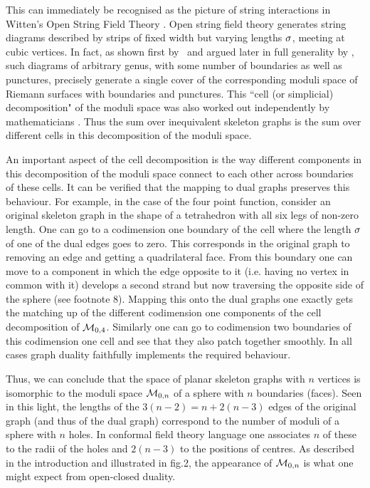 This can immediately be recognised as the picture of string
interactions in Witten's Open String Field Theory \witcube . Open
string field theory generates string diagrams described by strips
of fixed width but varying lengths ${\sigma}$, meeting at cubic vertices. In
fact, as shown first by \gmw\ and argued later in full generality
by \zwie , such diagrams of arbitrary genus, with some number of
boundaries as well as punctures, precisely generate a single cover
of the corresponding moduli space of Riemann surfaces with
boundaries and punctures. This ``cell (or simplicial) decomposition" 
of the moduli
space was also worked out independently 
by mathematicians \penn . 
Thus the sum over inequivalent 
skeleton graphs is the sum over different cells in this decomposition 
of the moduli space.


An important aspect of the cell decomposition is the way different
components in this decomposition of the moduli space connect to
each other across boundaries of these cells. It can be
verified that the mapping to dual graphs preserves this behaviour.
For example, in the case of the four point function, consider an
original skeleton graph in the shape of a tetrahedron with all six
legs of non-zero length. One can go to a codimension one boundary
of the cell where the length ${\sigma}$ of one of the dual edges goes to
zero. This corresponds in the original graph to removing an edge and
getting a quadrilateral 
face.
From this boundary one can move to a component in which the
edge opposite to it (i.e. having no vertex in common with it)
develops a second strand but now traversing the opposite side of
the sphere (see footnote 8). Mapping this onto the dual graphs
one exactly gets the matching up of the different  
codimension one components
of
the cell decomposition of ${\cal M}_{0,4}$. Similarly one can go
to codimension two boundaries of this codimension one cell and see
that they also patch together smoothly. In all cases graph duality
faithfully implements the required behaviour.


Thus, we can conclude that the space of planar skeleton graphs
with $n$ vertices is isomorphic to the moduli space ${\cal
M}_{0,n}$ of a sphere with $n$ boundaries (faces). Seen in this
light, the lengths of the $3(n-2)=n+2(n-3)$ edges of the original
graph (and thus of the dual graph) correspond to the number of
moduli of a sphere with $n$ holes. In conformal field theory
language one associates $n$ of these to the radii of the holes and
$2(n-3)$ to the positions of centres. As described in the
introduction and illustrated in fig.2, the appearance of ${\cal
M}_{0,n}$ is what one might expect from open-closed duality.

